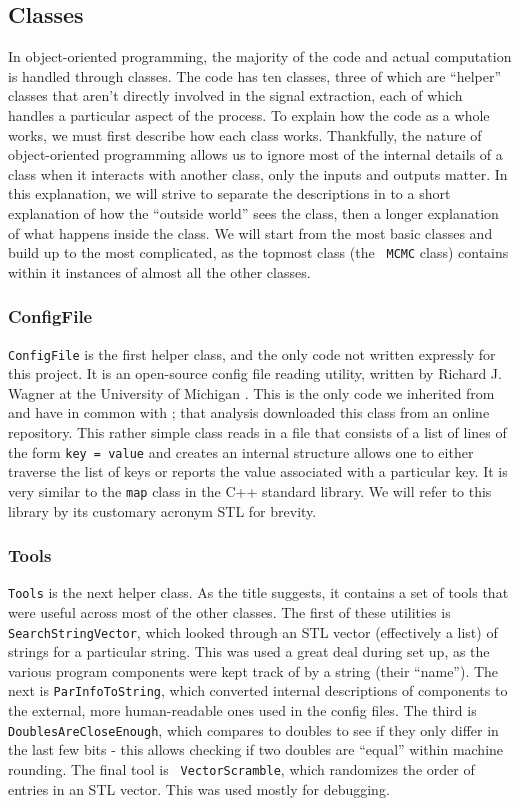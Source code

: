 \subsection{Classes}
In object-oriented programming, the majority of the code and actual
computation is handled through classes.  The code has ten classes,
three of which are ``helper'' classes that aren't directly involved in
the signal extraction, each of which handles a particular aspect of
the process.  To explain how the code as a whole works, we must first
describe how each class works.  Thankfully, the nature of
object-oriented programming allows us to ignore most of the internal
details of a class when it interacts with another class, only the
inputs and outputs matter.  In this explanation, we will strive to
separate the descriptions in to a short explanation of how the
``outside world'' sees the class, then a longer explanation of what
happens inside the class.  We will start from the most basic classes
and build up to the most complicated, as the topmost class (the {\tt
  MCMC} class) contains within it instances of almost all the other
classes.

\subsubsection{ConfigFile} 
{\tt ConfigFile} is the first helper class, and the only code not
written expressly for this project.  It is an open-source config file
reading utility, written by Richard J. Wagner at the University of
Michigan \cite{ConfigFileSite}.  This is the only code we inherited
from and have in common with \cite{NCDPRL}; that analysis downloaded
this class from an online repository.  This rather simple class reads
in a file that consists of a list of lines of the form \mbox{{\tt key
= value}} and creates an internal structure allows one to either
traverse the list of keys or reports the value associated with a
particular key.  It is very similar to the {\tt map} class in the C++
standard library.  We will refer to this library by its customary
acronym STL for brevity.

\subsubsection{Tools} 
{\tt Tools} is the next helper class.  As the title suggests, it
contains a set of tools that were useful across most of the other
classes.  The first of these utilities is {\tt SearchStringVector},
which looked through an STL vector (effectively a list) of strings for
a particular string.  This was used a great deal during set up, as the
various program components were kept track of by a string (their
``name'').  The next is {\tt ParInfoToString}, which converted
internal descriptions of components to the external, more
human-readable ones used in the config files.  The third is\\
\mbox{{\tt DoublesAreCloseEnough}}, which compares to doubles to see if
they only differ in the last few bits - this allows checking if two
doubles are ``equal'' within machine rounding.  The final tool is {\tt
VectorScramble}, which randomizes the order of entries in an STL
vector.  This was used mostly for debugging.

